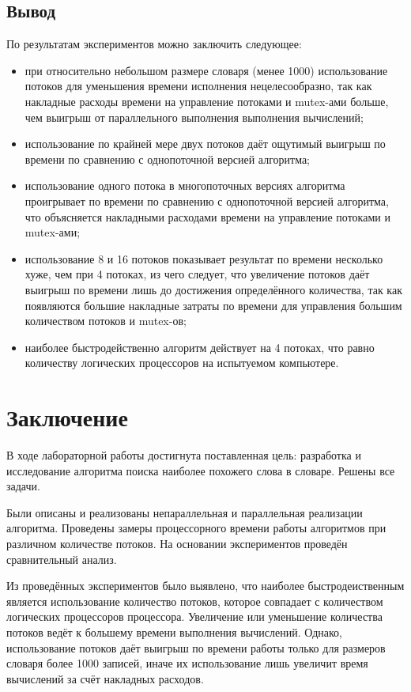 \documentclass[12pt,a4paper]{report}
\begin{document}
\newpage
\section{Вывод}

По результатам экспериментов можно заключить следующее:
\begin{itemize}
    \item при относительно небольшом размере словаря (менее 1000) использование потоков для 
    уменьшения времени исполнения нецелесообразно, так как накладные расходы времени на 
    управление потоками и mutex-ами больше, чем выигрыш от параллельного выполнения выполнения
    вычислений;
    \item использование по крайней мере двух потоков даёт ощутимый выигрыш по времени по 
    сравнению с однопоточной версией алгоритма;
    \item использование одного потока в многопоточных версиях алгоритма проигрывает по времени
    по сравнению с однопоточной версией алгоритма, что объясняется накладными расходами времени
    на управление потоками и mutex-ами;
    \item использование 8 и 16 потоков показывает результат по времени несколько хуже, чем при 
    4 потоках, из чего следует, что увеличение потоков даёт выигрыш по времени лишь до достижения
    определённого количества, так как появляются большие накладные затраты по времени для 
    управления большим количеством потоков и mutex-ов;
    \item наиболее быстродейственно алгоритм действует на 4 потоках, что равно количеству 
    логических процессоров на испытуемом компьютере.
\end{itemize}

\newpage
\chapter*{Заключение}

В ходе лабораторной работы достигнута поставленная цель: разработка и исследование алгоритма поиска наиболее похожего слова в словаре.
Решены все задачи.

Были описаны и реализованы непараллельная и параллельная реализации алгоритма.
Проведены замеры процессорного времени работы алгоритмов при различном количестве потоков.
На основании экспериментов проведён сравнительный анализ.

Из проведённых экспериментов было выявлено, что наиболее быстродеиственным является использование
количество потоков, которое совпадает с количеством логических процессоров процессора. 
Увеличение или уменьшение количества потоков ведёт к большему времени выполнения вычислений.
Однако, использование потоков даёт выигрыш по времени работы только для размеров словаря более 1000 записей, иначе их использование лишь увеличит время вычислений за счёт накладных
расходов.
\end{document}

